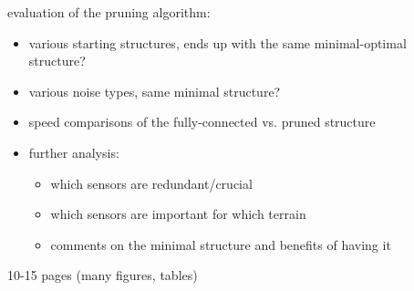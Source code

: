 evaluation of the pruning algorithm:
\begin{itemize}
\item various starting structures, ends up with the same minimal-optimal structure?
\item various noise types, same minimal structure?
\item speed comparisons of the fully-connected vs. pruned structure
\item further analysis:
 \begin{itemize}
 \item which sensors are redundant/crucial
 \item which sensors are important for which terrain
 \item comments on the minimal structure and benefits of having it
 \end{itemize}
\end{itemize}
10-15 pages (many figures, tables)
